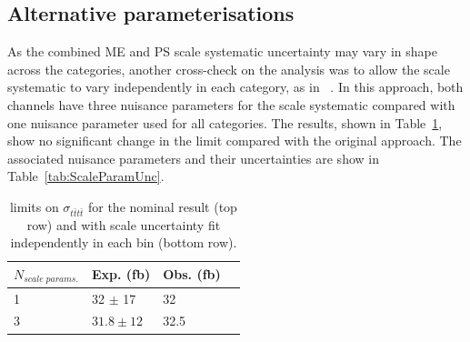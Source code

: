 


\subsection{Alternative parameterisations}

As the combined ME and PS scale systematic uncertainty may vary in shape across the \njets categories, another cross-check on the analysis was to allow the scale systematic to vary independently in each \njets category, as in ~\cite{ref:heavyquarksSplit, ref:B2G-12-004}. In this approach, both channels have three nuisance parameters for the scale systematic compared with one nuisance parameter used for all \njets categories. The results, shown in Table~\ref{tab:limsScale}, show no significant change in the limit compared with the original approach. The associated nuisance parameters and their uncertainties are show in Table~\ref{tab:ScaleParamUnc}.

\begin{table}[ht!]
\centering
\begin{tabular}{| l | l | l | p{1cm} |}
 \hline 
$N_{scale \; params.}$ & Exp. (fb) &Obs. (fb) \\
\hline
1&{\color{blue} 32  $\pm$ 17}  & {\color{blue}32}\\
 \hline
3  &  $31.8\pm{12}$ & 32.5 \\
\hline
\end{tabular}
\caption{\CLS limits on $\sigma_{t\bar{t}t\bar{t}}$ for the nominal result (top row) and with scale uncertainty fit independently in each \njets bin (bottom row). }
\label{tab:limsScale}
\end{table}

